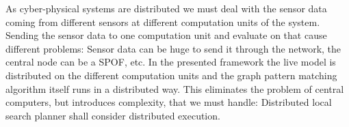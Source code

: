 
As cyber-physical systems are distributed we must deal with the sensor data coming from different sensors at different computation units of the system. 
Sending the sensor data to one computation unit and evaluate on that cause different problems: 
Sensor data can be huge to send it through the network, the central node can be a SPOF, etc. 
In the presented framework the live model is distributed on the different computation units and the graph pattern matching algorithm itself runs in a distributed way. 
This eliminates the problem of central computers, but introduces complexity, that we must handle: Distributed local search planner shall consider distributed execution.







